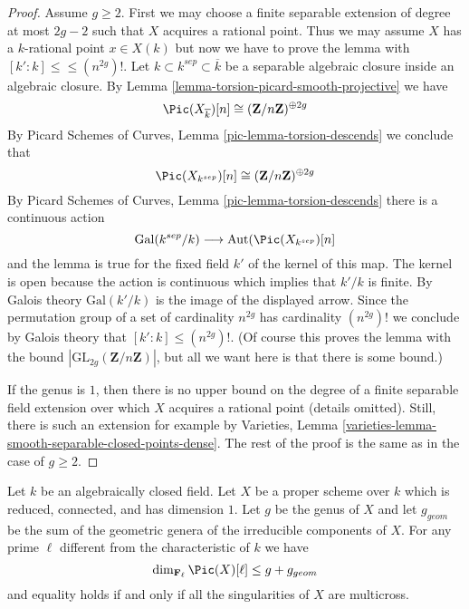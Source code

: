 \begin{proof}
Assume $g \geq 2$. First we may choose a finite separable extension
of degree at most $2g - 2$ such that $X$ acquires a rational point.
Thus we may assume $X$ has a $k$-rational point $x \in X(k)$
but now we have to prove the lemma with
$[k' : k] \leq \leq (n^{2g})!$.
Let $k \subset k^{sep} \subset \overline{k}$ be a separable algebraic
closure inside an algebraic closure.
By Lemma \ref{lemma-torsion-picard-smooth-projective} we have
$$
\Pic(X_{\overline{k}})[n] \cong (\mathbf{Z}/n\mathbf{Z})^{\oplus 2g}
$$
By Picard Schemes of Curves, Lemma \ref{pic-lemma-torsion-descends}
we conclude that
$$
\Pic(X_{k^{sep}})[n] \cong (\mathbf{Z}/n\mathbf{Z})^{\oplus 2g}
$$
By Picard Schemes of Curves, Lemma \ref{pic-lemma-torsion-descends}
there is a continuous action
$$
\text{Gal}(k^{sep}/k)
\longrightarrow
\text{Aut}(\Pic(X_{k^{sep}})[n]
$$
and the lemma is true for the fixed field $k'$ of the kernel of this map.
The kernel is open because the action is continuous which implies
that $k'/k$ is finite. By Galois theory $\text{Gal}(k'/k)$
is the image of the displayed arrow. Since the permutation
group of a set of cardinality $n^{2g}$ has cardinality $(n^{2g})!$
we conclude by Galois theory that $[k' : k] \leq (n^{2g})!$.
(Of course this proves the lemma with the bound
$|\text{GL}_{2g}(\mathbf{Z}/n\mathbf{Z})|$, but all we want
here is that there is some bound.)

\medskip\noindent
If the genus is $1$, then there is no upper bound on the degree of a
finite separable field extension over which $X$ acquires a rational point
(details omitted). Still, there is such an extension for example by
Varieties, Lemma \ref{varieties-lemma-smooth-separable-closed-points-dense}.
The rest of the proof is the same as in the case of $g \geq 2$.
\end{proof}

\begin{proposition}
\label{proposition-torsion-picard-reduced-proper}
Let $k$ be an algebraically closed field. Let $X$ be a proper scheme over $k$
which is reduced, connected, and has dimension $1$. Let $g$ be the genus
of $X$ and let $g_{geom}$ be the sum of the geometric genera of the
irreducible components of $X$. For any prime $\ell$ different from
the characteristic of $k$ we have
$$
\dim_{\mathbf{F}_\ell} \Pic(X)[\ell]
\leq g + g_{geom}
$$
and equality holds if and only if all the singularities of $X$
are multicross.
\end{proposition}

